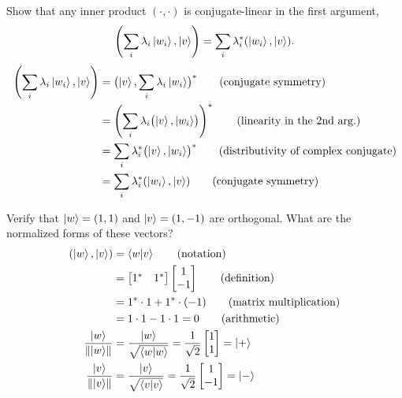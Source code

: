  Show that any inner product $(\cdot,\cdot)$ is conjugate-linear in the first argument,
\[
\left(\sum_i \lambda_i\ket{w_i}, \ket{v}\right) = \sum_i \lambda_i^{*}(\ket{w_i}, \ket{v}).
\]
\Soln
\begin{align*}
	\left(\sum_i \lambda_i \ket{w_i},\ket{v}\right) &=
	\bigl(\ket{v},\sum_i \lambda_i \ket{w_i}\bigr)^* \tag{conjugate symmetry}\\
	&= \left(\sum_i \lambda_i \bigl(\ket{v},\ket{w_i}  \bigr) \right)^*\tag{linearity in the 2nd arg.}\\
	&= \sum_i \lambda_i^* \bigl(\ket{v},\ket{w_i} \bigr)^* \tag{distributivity of complex conjugate}\\
	&= \sum_i \lambda_i^* (\ket{w_i},\ket{v}) \tag{conjugate symmetry}
\end{align*}


 Verify that $\ket{w} = (1,1)$ and $\ket{v} = (1,-1)$ are orthogonal.  What are the normalized forms of these vectors?
\Soln
\begin{align*}
	 (\ket{w}, \ket{v}) &= 	\braket{w | v} \tag{notation} \\
	 &= \begin{bmatrix}
		1^* & 1^*
		\end{bmatrix}
		\begin{bmatrix}
		1 \\
		-1
		\end{bmatrix} \tag{definition}\\
	&= 1^*\cdot1 + 1^*\cdot(-1) \tag{matrix multiplication} \\
	&= 1\cdot1 - 1\cdot1 = 0 \tag{arithmetic}\\
%
	\frac{\ket{w}}{\norm{\ket{w}}} &=
	\frac{\ket{w}}{\sqrt{\braket{w|w}}} = \frac{1}{\sqrt{2}} \begin{bmatrix}
	1 \\
	1
	\end{bmatrix}
	= \ket{+} \\
%
	\frac{\ket{v}}{\norm{\ket{v}}} &=
	\frac{\ket{v}}{\sqrt{\braket{v|v}}} = \frac{1}{\sqrt{2}} \begin{bmatrix}
	1 \\
	-1
	\end{bmatrix}
	=\ket{-}
\end{align*}



